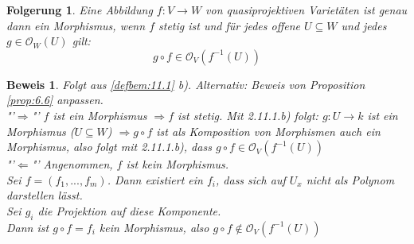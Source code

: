\documentclass[a4paper,12pt]{report}
\theoremstyle{break}
\newtheorem{Folg}[Def]{Folgerung}
\theoremstyle{nonumberbreak}
\theoremstyle{nonumberplain}
\newtheorem{Bew}{Beweis}
\begin{document}
\begin{Folg}
  \label{folg:11.2}
  Eine Abbildung $f:V\longrightarrow W$ von quasiprojektiven Varietäten ist genau dann ein Morphismus,
  wenn $f$ stetig ist und für jedes offene $U\subseteq W$ und jedes $g\in \mathcal O_W(U)$ gilt:
  \[
  g\circ f\in\mathcal O_V(f^{-1}(U))
  \]
\end{Folg}
\begin{Bew}
  Folgt aus \ref{defbem:11.1} b). Alternativ: Beweis von Proposition \ref{prop:6.6} anpassen.\\
"'$\Rightarrow$"'
$f$ ist ein Morphismus $\Rightarrow f$ ist stetig. Mit 2.11.1.b) folgt: $g: U\rightarrow k$ ist ein Morphismus ($U\subseteq W$) $\Rightarrow g\circ f$ ist als Komposition von Morphismen auch ein Morphismus, also folgt mit 2.11.1.b), dass $g\circ f\in \mathcal O_V(f^{-1}(U))$\\
"'$\Leftarrow$"' Angenommen, $f$ ist kein Morphismus.\\
Sei $f=(f_1,...,f_m)$. Dann existiert ein $f_i$, dass sich auf $U_x$ nicht als Polynom darstellen lässt.\\
Sei $g_i$ die Projektion auf diese Komponente.\\
Dann ist $g\circ f=f_i$ kein Morphismus, also $g\circ f\notin \mathcal O_V(f^{-1}(U))$ 
\end{Bew}
\end{document}
